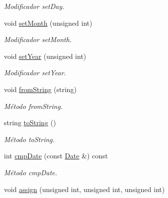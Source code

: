 \begin{DoxyCompactItemize}
\begin{DoxyCompactList}\small\item\em Modificador set\+Day. \end{DoxyCompactList}\item 
void \hyperlink{class_date_aae2c1d1158d2760ba4d5a23c528fd24d}{set\+Month} (unsigned int)\hypertarget{class_date_aae2c1d1158d2760ba4d5a23c528fd24d}{}\label{class_date_aae2c1d1158d2760ba4d5a23c528fd24d}

\begin{DoxyCompactList}\small\item\em Modificador set\+Month. \end{DoxyCompactList}\item 
void \hyperlink{class_date_abf7cafce8365f4ad601c270bb3f0f02d}{set\+Year} (unsigned int)\hypertarget{class_date_abf7cafce8365f4ad601c270bb3f0f02d}{}\label{class_date_abf7cafce8365f4ad601c270bb3f0f02d}

\begin{DoxyCompactList}\small\item\em Modificador set\+Year. \end{DoxyCompactList}\item 
void \hyperlink{class_date_a4ca1e1caba11928c842f6c62a2c851ab}{from\+String} (string)\hypertarget{class_date_a4ca1e1caba11928c842f6c62a2c851ab}{}\label{class_date_a4ca1e1caba11928c842f6c62a2c851ab}

\begin{DoxyCompactList}\small\item\em Método from\+String. \end{DoxyCompactList}\item 
string \hyperlink{class_date_adebdb45904dc2fbfacc66aa7528e0c04}{to\+String} ()
\begin{DoxyCompactList}\small\item\em Método to\+String. \end{DoxyCompactList}\item 
int \hyperlink{class_date_a6b90dc5b28b40c59af3758aeaf6edc12}{cmp\+Date} (const \hyperlink{class_date}{Date} \&) const 
\begin{DoxyCompactList}\small\item\em Método cmp\+Date. \end{DoxyCompactList}\item 
void \hyperlink{class_date_a2ad9e0b62b3abea9c9d471373ce5fdef}{assign} (unsigned int, unsigned int, unsigned int)\hypertarget{class_date_a2ad9e0b62b3abea9c9d471373ce5fdef}{}\label{class_date_a2ad9e0b62b3abea9c9d471373ce5fdef}


\end{DoxyCompactItemize}
